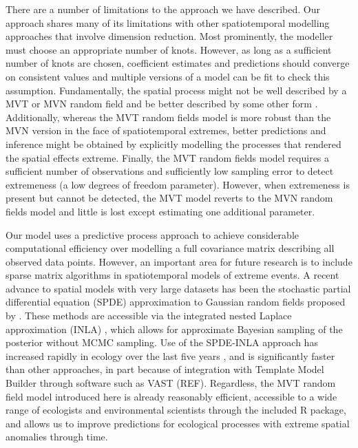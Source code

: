 \documentclass[12pt,english]{article}
\begin{document}
\begin{spacing}{1.9}
There are a number of limitations to the approach we have described. Our
approach shares many of its limitations with other spatiotemporal modelling
approaches that involve dimension reduction. Most prominently, the modeller must
choose an appropriate number of knots. However, as long as a sufficient number
of knots are chosen, coefficient estimates and predictions should converge on
consistent values and multiple versions of a model can be fit to check this
assumption. Fundamentally, the spatial process might not be well described by a
MVT or MVN random field and be better described by some other form
\citep[e.g.][]{conn2015}. Additionally, whereas the MVT random fields model is
more robust than the MVN version in the face of spatiotemporal extremes, better
predictions and inference might be obtained by explicitly modelling the
processes that rendered the spatial effects extreme. Finally, the MVT random
fields model requires a sufficient number of observations and sufficiently low
sampling error to detect extremeness (a low degrees of freedom parameter).
However, when extremeness is present but cannot be detected, the MVT model
reverts to the MVN random fields model and little is lost except estimating one
additional parameter.

Our model uses a predictive process approach to achieve considerable
computational efficiency over modelling a full covariance matrix describing all
observed data points. However, an important area for future research is to
include sparse matrix algorithms in spatiotemporal models of extreme events. A
recent advance to spatial models with very large datasets has been the
stochastic partial differential equation (SPDE) approximation to Gaussian random
fields proposed by \citet{lindgren2011}. These methods are accessible via the
integrated nested Laplace approximation (INLA) \citep{rue2009}, which allows for
approximate Bayesian sampling of the posterior without MCMC sampling. Use of the
SPDE-INLA approach has increased rapidly in ecology over the last five years
\citep[e.g.][]{illian2013, ono2016}, and is significantly faster than other
approaches, in part because of integration with Template Model Builder through
software such as VAST (REF). Regardless, the MVT random field model introduced
here is already reasonably efficient, accessible to a wide range of ecologists
and environmental scientists through the included R package, and allows us to
improve predictions for ecological processes with extreme spatial anomalies
through time.



\end{spacing}
\end{document}
